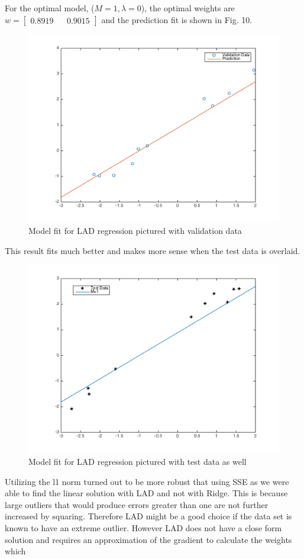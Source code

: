 \documentclass[10pt,twocolumn]{article}
\begin{document}
For the optimal model, ($M=1, \lambda = 0$), the optimal weights are $w= \begin{bmatrix} 0.8919  &&   0.9015 \end{bmatrix}$ and the prediction fit is shown in Fig. 10. 
\begin{figure}[H]
\center
\includegraphics[scale =.4]{4_1.png}
\caption{Model fit for LAD regression pictured with validation data}
\end{figure}

This result fits much better and makes more sense when the test data is overlaid. 
\begin{figure}[H]
\center
\includegraphics[scale =.4]{4_1test.png}
\caption{Model fit for LAD regression pictured with test data as well}
\end{figure}

Utilizing the l1 norm turned out to be more robust that using SSE as we were able to find the linear solution with LAD and not with Ridge. This is because large outliers that would produce errors greater than one are not further increased by squaring. Therefore LAD might be a good choice if the data set is known to have an extreme outlier. However LAD does not have a close form solution and requires an approximation of the gradient to calculate the weights which 
 
 
\end{document}
